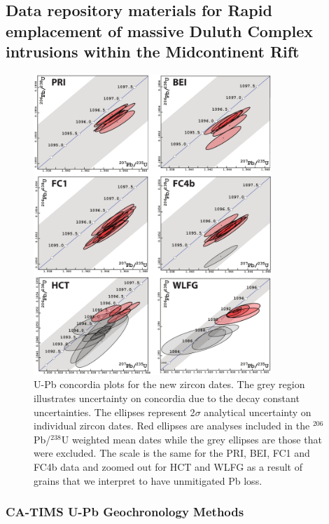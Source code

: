 \documentclass[11pt,letterpaper]{article}
\begin{document}
\subsection*{Data repository materials for Rapid emplacement of massive Duluth Complex intrusions within the Midcontinent Rift}

\renewcommand{\thefigure}{DR\arabic{figure}}
\begin{figure}[!ht]
\noindent\includegraphics[width=0.8\textwidth]{./repository/Concordia_Plots.pdf}
\centering
\caption{\small{U-Pb concordia plots for the new zircon dates. The grey region illustrates uncertainty on concordia due to the decay constant uncertainties. The ellipses represent  2$\sigma$ analytical uncertainty on individual zircon dates. Red ellipses are analyses included in the $^{206}$Pb/$^{238}$U weighted mean dates while the grey ellipses are those that were excluded. The scale is the same for the PRI, BEI, FC1 and FC4b data and zoomed out for HCT and WLFG as a result of grains that we interpret to have unmitigated Pb loss.}}
\label{fig:map}
\end{figure}

\subsubsection*{CA-TIMS U-Pb Geochronology Methods}
\end{document}
